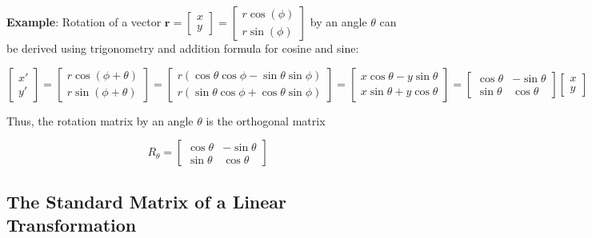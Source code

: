 \textbf{Example}: Rotation of a vector $\mathbf{r} = \begin{bmatrix}
    x \\ y
\end{bmatrix} = \begin{bmatrix}
    r \cos(\phi) \\ r \sin(\phi)
\end{bmatrix}$ by an angle $\theta$ can be derived using trigonometry and addition formula for cosine and sine:

$$
\begin{bmatrix}
    x' \\ y'
\end{bmatrix} = \begin{bmatrix}
    r \cos(\phi + \theta) \\ r \sin(\phi + \theta)
\end{bmatrix} = \begin{bmatrix}
    r ( \cos \theta \cos \phi - \sin \theta \sin \phi ) \\ r ( \sin \theta \cos \phi + \cos \theta \sin \phi )
\end{bmatrix} = \begin{bmatrix}
    x \cos \theta - y \sin \theta \\ x \sin \theta + y \cos \theta
\end{bmatrix} = \begin{bmatrix}
    \cos \theta & - \sin \theta \\
    \sin \theta & \cos \theta
\end{bmatrix} \begin{bmatrix}
    x \\ y
\end{bmatrix}
$$

Thus, the rotation matrix by an angle $\theta$ is the orthogonal matrix

$$
R_\theta = \begin{bmatrix}
    \cos \theta & - \sin \theta \\
    \sin \theta & \cos \theta
\end{bmatrix}
$$

\newpage

\subsection{The Standard Matrix of a Linear Transformation}

